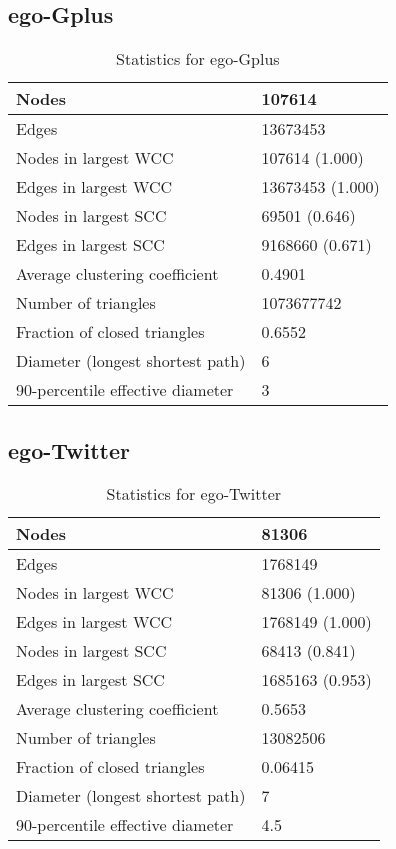 \documentclass[12pt,a4paper]{article}
\begin{document}
\subsection*{ego-Gplus}
\begin{table}[H]
\centering
\begin{tabular}{|l|l|}
\hline
Nodes                   & 107614\\ \hline
Edges                   & 13673453\\ \hline
Nodes in largest WCC    & 107614 (1.000)\\ \hline
Edges in largest WCC    & 13673453 (1.000)\\ \hline
Nodes in largest SCC    & 69501 (0.646) \\ \hline
Edges in largest SCC    & 9168660 (0.671) \\ \hline
Average clustering coefficient      & 0.4901\\ \hline
Number of triangles                 & 1073677742\\ \hline
Fraction of closed triangles        & 0.6552\\ \hline
Diameter (longest shortest path)    & 6\\ \hline
90-percentile effective diameter    & 3\\ \hline

\end{tabular}
\caption{Statistics for ego-Gplus}
\end{table}

\subsection*{ego-Twitter}
\begin{table}[H]
\centering
\begin{tabular}{|l|l|}
\hline
Nodes                   & 81306 \\ \hline
Edges                   & 1768149 \\ \hline
Nodes in largest WCC    & 81306 (1.000) \\ \hline
Edges in largest WCC    & 1768149 (1.000) \\ \hline
Nodes in largest SCC    & 68413 (0.841) \\ \hline
Edges in largest SCC    & 1685163 (0.953) \\ \hline
Average clustering coefficient      & 0.5653 \\ \hline
Number of triangles                 & 13082506 \\ \hline
Fraction of closed triangles        & 0.06415 \\ \hline
Diameter (longest shortest path)    & 7 \\ \hline
90-percentile effective diameter    & 4.5 \\ \hline

\end{tabular}
\caption{Statistics for ego-Twitter}
\end{table}
\end{document}
